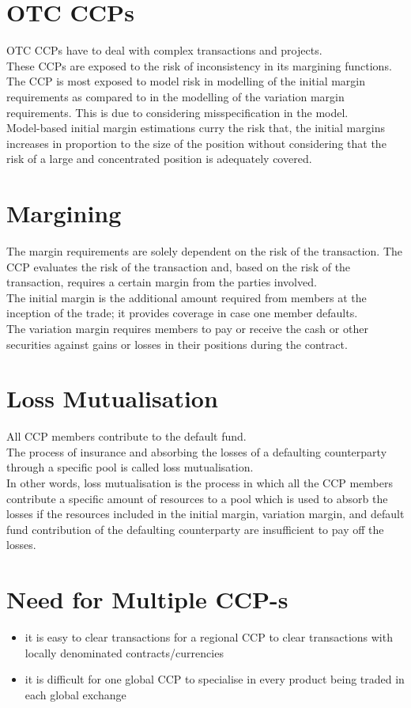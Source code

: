 \section{OTC CCPs}
OTC CCPs have to deal with complex transactions and projects.\\
These CCPs are exposed to the risk of inconsistency in its margining functions.\\
The CCP is most exposed to model risk in modelling of the initial margin requirements as compared to in the modelling of the variation margin requirements. This is due to considering misspecification in the model.\\
Model-based initial margin estimations curry the risk that, the initial margins increases in proportion to the size of the position without considering that the risk of a large and concentrated position is adequately covered.

\section{Margining}
The margin requirements are solely dependent on the risk of the transaction. The CCP evaluates the risk of the transaction and, based on the risk of the transaction, requires a certain margin from the parties involved.\\
The initial margin is the additional amount required from members at the inception of the trade; it provides coverage in case one member defaults.\\
The variation margin requires members to pay or receive the cash or other securities against gains or losses in their positions during the contract.

\section{Loss Mutualisation}
All CCP members contribute to the default fund.\\
The process of insurance and absorbing the losses of a defaulting counterparty through a specific pool is called loss mutualisation.\\
In other words, loss mutualisation is the process in which all the CCP members contribute a specific amount of resources to a pool which is used to absorb the losses if the resources included in the initial margin, variation margin, and default fund contribution of the defaulting counterparty are insufficient to pay off the losses.

\section{Need for Multiple CCP-s}
\begin{itemize}
	\item it is easy to clear transactions for a regional CCP to clear transactions with locally denominated contracts/currencies
	\item it is difficult for one global CCP to specialise in every product being traded in each global exchange
\end{itemize}


